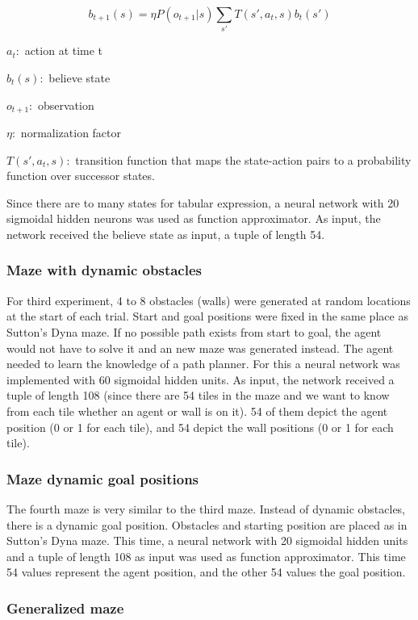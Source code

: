 \documentclass[letterpaper]{article}
\begin{document}
\[ b_{t+1}(s) = \eta P(o_{t+1}|s) \sum_{s'}T(s',a_t,s) b_t(s') \]

\(a_t:\) action at time t

\(b_t(s):\) believe state

\(o_{t+1}:\) observation

\(\eta:\) normalization factor

\(T(s',a_t,s):\) transition function that maps the state-action pairs to
a probability function over successor states.

Since there are to many states for tabular expression, a neural network
with 20 sigmoidal hidden neurons was used as function approximator. As
input, the network received the believe state as input, a tuple of
length 54.

\subsubsection{Maze with dynamic
obstacles}\label{maze-with-dynamic-obstacles}

For third experiment, 4 to 8 obstacles (walls) were generated at random
locations at the start of each trial. Start and goal positions were
fixed in the same place as Sutton's Dyna maze. If no possible path
exists from start to goal, the agent would not have to solve it and an
new maze was generated instead. The agent needed to learn the knowledge
of a path planner. For this a neural network was implemented with 60
sigmoidal hidden units. As input, the network received a tuple of length
108 (since there are 54 tiles in the maze and we want to know from each
tile whether an agent or wall is on it). 54 of them depict the agent
position (0 or 1 for each tile), and 54 depict the wall positions (0 or
1 for each tile).

\subsubsection{Maze dynamic goal
positions}\label{maze-dynamic-goal-positions}

The fourth maze is very similar to the third maze. Instead of dynamic
obstacles, there is a dynamic goal position. Obstacles and starting
position are placed as in Sutton's Dyna maze. This time, a neural
network with 20 sigmoidal hidden units and a tuple of length 108 as
input was used as function approximator. This time 54 values represent
the agent position, and the other 54 values the goal position.

\subsubsection{Generalized maze}\label{generalized-maze}
\end{document}
